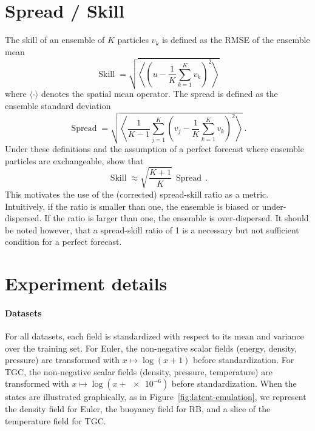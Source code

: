 \begin{subappendices}

\clearpage
\section{Spread / Skill}

The skill \cite{fortin2014why, price2025probabilistic} of an ensemble of $K$ particles $v_k$ is defined as the RMSE of the ensemble mean
\begin{equation}
    \operatorname{Skill} = \sqrt{\left\langle \left( u - \frac{1}{K} \sum_{k=1}^K v_k \right)^2 \right\rangle}
\end{equation}
where $\langle \cdot \rangle$ denotes the spatial mean operator. The spread is defined as the ensemble standard deviation
\begin{equation}
    \operatorname{Spread} = \sqrt{\left\langle \frac{1}{K - 1} \sum_{j=1}^K  \left( v_j - \frac{1}{K} \sum_{k=1}^K v_k \right)^2 \right\rangle} \, .
\end{equation}
Under these definitions and the assumption of a perfect forecast where ensemble particles are exchangeable, \textcite{fortin2014why} show that
\begin{equation}
    \operatorname{Skill} \approx \sqrt{\frac{K+1}{K}} \, \operatorname{Spread} \, .
\end{equation}
This motivates the use of the (corrected) spread-skill ratio as a metric. Intuitively, if the ratio is smaller than one, the ensemble is biased or under-dispersed. If the ratio is larger than one, the ensemble is over-dispersed. It should be noted however, that a spread-skill ratio of 1 is a necessary but not sufficient condition for a perfect forecast.

\clearpage
\section{Experiment details} \label{app:details}

\paragraph{Datasets} For all datasets, each field is standardized with respect to its mean and variance over the training set. For Euler, the non-negative scalar fields (energy, density, pressure) are transformed with $x \mapsto \log (x + 1)$ before standardization. For TGC, the non-negative scalar fields (density, pressure, temperature) are transformed with $x \mapsto \log (x + \num{e-6})$ before standardization. When the states are illustrated graphically, as in Figure~\ref{fig:latent-emulation}, we represent the density field for Euler, the buoyancy field for RB, and a slice of the temperature field for TGC.


\end{subappendices}
